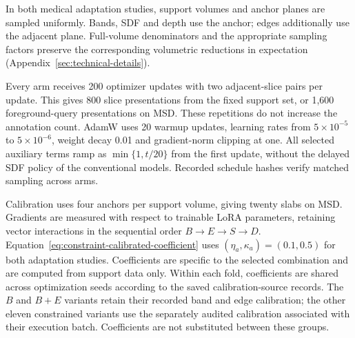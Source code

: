 \documentclass[12pt,a4paper]{article}
\begin{document}
In both medical adaptation studies, support volumes and anchor planes
are sampled uniformly. Bands, SDF
and depth use the anchor; edges additionally use the adjacent plane.
Full-volume denominators and the appropriate sampling factors preserve
the corresponding volumetric reductions in expectation
(Appendix~\ref{sec:technical-details}).

Every arm receives 200 optimizer updates with two adjacent-slice pairs
per update. This gives 800 slice presentations from the fixed support
set, or 1,600 foreground-query presentations on MSD.
These repetitions do not increase the annotation count. AdamW uses
20 warmup updates, learning rates from $5\times10^{-5}$ to
$5\times10^{-6}$, weight decay 0.01 and gradient-norm clipping at one.
All selected auxiliary terms ramp as $\min\{1,t/20\}$ from the first
update, without the delayed SDF policy of the conventional models.
Recorded schedule hashes verify matched sampling across arms.

Calibration uses four anchors per support volume, giving twenty slabs
on MSD. Gradients are measured with respect to trainable
LoRA parameters, retaining vector interactions in the sequential order
$B\to E\to S\to D$. Equation~\ref{eq:constraint-calibrated-coefficient}
uses $(\eta_a,\kappa_a)=(0.1,0.5)$ for both adaptation studies. Coefficients
are specific to the selected combination and are computed from support
data only. Within each fold, coefficients are shared across optimization
seeds according to the saved calibration-source records. The $B$ and
$B+E$ variants retain their recorded band and edge calibration; the
other eleven constrained variants use the separately audited calibration
associated with their execution batch. Coefficients are not substituted
between these groups.
\end{document}
